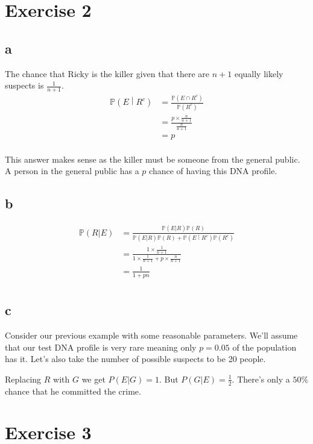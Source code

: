\documentclass{article}
\newcommand{\prob}{\mathbb{P}}
\begin{document}
\section{Exercise 2}
\subsection{a}
The chance that Ricky is the killer given that there are $n+1$ equally likely
suspects is $\frac{1}{n+1}$.
\begin{align*}
    \prob \left(E \middle| R^c\right)
    &= \frac{\prob \left(E \cap R^c\right)}{\prob \left(R^c\right)} \\
    &= \frac{p \times \frac{n}{n+1}}{\frac{n}{n+1}} \\
    &= p \\
\end{align*}

This answer makes sense as the killer must be someone from the general public.
A person in the general public has a $p$ chance of having this DNA profile.

\subsection{b}
\begin{align*}
    \prob(R|E)
    &= \frac{\prob(E|R) \prob(R)}{\prob(E|R)\prob(R)
        + \prob\left(E\middle|R^c\right)\prob\left(R^c\right)} \\
    &= \frac{1 \times \frac{1}{n+1}}{1 \times \frac{1}{n+1}
        + p \times \frac{n}{n+1}} \\
    &= \frac{1}{1 + pn} \\
\end{align*}

\subsection{c}
Consider our previous example with some reasonable parameters. We'll assume
that our test DNA profile is very rare meaning only $p=0.05$ of the population
has it. Let's also take the number of possible suspects to be 20 people.

Replacing $R$ with $G$ we get $P(E|G) = 1$. But $P(G|E) = \frac{1}{2}$.
There's only a $50\%$ chance that he committed the crime.

\section{Exercise 3}
\end{document}
